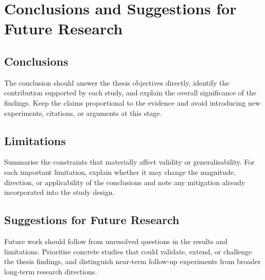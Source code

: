 \chapter{Conclusions and Suggestions for Future Research}
\label{ch:conclusions}

\section{Conclusions}

The conclusion should answer the thesis objectives directly, identify the
contribution supported by each study, and explain the overall significance of the
findings. Keep the claims proportional to the evidence and avoid introducing new
experiments, citations, or arguments at this stage.

\section{Limitations}

Summarise the constraints that materially affect validity or generalisability. For
each important limitation, explain whether it may change the magnitude, direction,
or applicability of the conclusions and note any mitigation already incorporated
into the study design.

\section{Suggestions for Future Research}

Future work should follow from unresolved questions in the results and limitations.
Prioritise concrete studies that could validate, extend, or challenge the thesis
findings, and distinguish near-term follow-up experiments from broader long-term
research directions.
